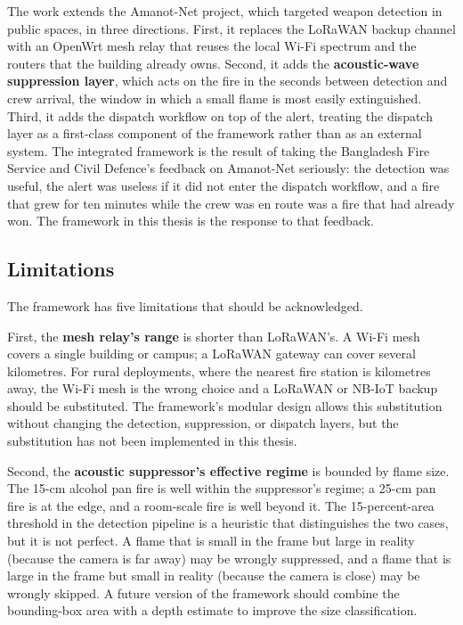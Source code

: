 The work extends the Amanot-Net project, which targeted weapon detection in public spaces, in three directions. First, it replaces the LoRaWAN backup channel with an OpenWrt mesh relay that reuses the local Wi-Fi spectrum and the routers that the building already owns. Second, it adds the \textbf{acoustic-wave suppression layer}, which acts on the fire in the seconds between detection and crew arrival, the window in which a small flame is most easily extinguished. Third, it adds the dispatch workflow on top of the alert, treating the dispatch layer as a first-class component of the framework rather than as an external system. The integrated framework is the result of taking the Bangladesh Fire Service and Civil Defence's feedback on Amanot-Net seriously: the detection was useful, the alert was useless if it did not enter the dispatch workflow, and a fire that grew for ten minutes while the crew was en route was a fire that had already won. The framework in this thesis is the response to that feedback.

\subsection{Limitations}

The framework has five limitations that should be acknowledged.

First, the \textbf{mesh relay's range} is shorter than LoRaWAN's. A Wi-Fi mesh covers a single building or campus; a LoRaWAN gateway can cover several kilometres. For rural deployments, where the nearest fire station is kilometres away, the Wi-Fi mesh is the wrong choice and a LoRaWAN or NB-IoT backup should be substituted. The framework's modular design allows this substitution without changing the detection, suppression, or dispatch layers, but the substitution has not been implemented in this thesis.

Second, the \textbf{acoustic suppressor's effective regime} is bounded by flame size. The 15-cm alcohol pan fire is well within the suppressor's regime; a 25-cm pan fire is at the edge, and a room-scale fire is well beyond it. The 15-percent-area threshold in the detection pipeline is a heuristic that distinguishes the two cases, but it is not perfect. A flame that is small in the frame but large in reality (because the camera is far away) may be wrongly suppressed, and a flame that is large in the frame but small in reality (because the camera is close) may be wrongly skipped. A future version of the framework should combine the bounding-box area with a depth estimate to improve the size classification.

